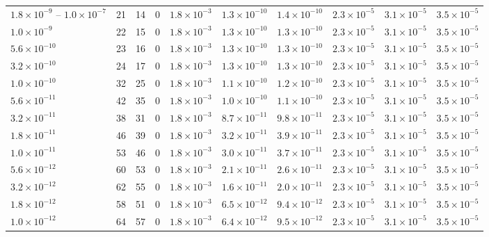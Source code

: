 \begin{tabular}{lrrrrrrrrr}
$1.8\!\times\!10^{-9}$ -- $1.0\!\times\!10^{-7}$ & 21 & 14 & 0 & $1.8\!\times\!10^{-3}$ & $1.3\!\times\!10^{-10}$ & $1.4\!\times\!10^{-10}$ & $2.3\!\times\!10^{-5}$ & $3.1\!\times\!10^{-5}$ & $3.5\!\times\!10^{-5}$\\
$1.0\!\times\!10^{-9}$ & 22 & 15 & 0 & $1.8\!\times\!10^{-3}$ & $1.3\!\times\!10^{-10}$ & $1.3\!\times\!10^{-10}$ & $2.3\!\times\!10^{-5}$ & $3.1\!\times\!10^{-5}$ & $3.5\!\times\!10^{-5}$\\
$5.6\!\times\!10^{-10}$ & 23 & 16 & 0 & $1.8\!\times\!10^{-3}$ & $1.3\!\times\!10^{-10}$ & $1.3\!\times\!10^{-10}$ & $2.3\!\times\!10^{-5}$ & $3.1\!\times\!10^{-5}$ & $3.5\!\times\!10^{-5}$\\
$3.2\!\times\!10^{-10}$ & 24 & 17 & 0 & $1.8\!\times\!10^{-3}$ & $1.3\!\times\!10^{-10}$ & $1.3\!\times\!10^{-10}$ & $2.3\!\times\!10^{-5}$ & $3.1\!\times\!10^{-5}$ & $3.5\!\times\!10^{-5}$\\
$1.0\!\times\!10^{-10}$ & 32 & 25 & 0 & $1.8\!\times\!10^{-3}$ & $1.1\!\times\!10^{-10}$ & $1.2\!\times\!10^{-10}$ & $2.3\!\times\!10^{-5}$ & $3.1\!\times\!10^{-5}$ & $3.5\!\times\!10^{-5}$\\
$5.6\!\times\!10^{-11}$ & 42 & 35 & 0 & $1.8\!\times\!10^{-3}$ & $1.0\!\times\!10^{-10}$ & $1.1\!\times\!10^{-10}$ & $2.3\!\times\!10^{-5}$ & $3.1\!\times\!10^{-5}$ & $3.5\!\times\!10^{-5}$\\
$3.2\!\times\!10^{-11}$ & 38 & 31 & 0 & $1.8\!\times\!10^{-3}$ & $8.7\!\times\!10^{-11}$ & $9.8\!\times\!10^{-11}$ & $2.3\!\times\!10^{-5}$ & $3.1\!\times\!10^{-5}$ & $3.5\!\times\!10^{-5}$\\
$1.8\!\times\!10^{-11}$ & 46 & 39 & 0 & $1.8\!\times\!10^{-3}$ & $3.2\!\times\!10^{-11}$ & $3.9\!\times\!10^{-11}$ & $2.3\!\times\!10^{-5}$ & $3.1\!\times\!10^{-5}$ & $3.5\!\times\!10^{-5}$\\
$1.0\!\times\!10^{-11}$ & 53 & 46 & 0 & $1.8\!\times\!10^{-3}$ & $3.0\!\times\!10^{-11}$ & $3.7\!\times\!10^{-11}$ & $2.3\!\times\!10^{-5}$ & $3.1\!\times\!10^{-5}$ & $3.5\!\times\!10^{-5}$\\
$5.6\!\times\!10^{-12}$ & 60 & 53 & 0 & $1.8\!\times\!10^{-3}$ & $2.1\!\times\!10^{-11}$ & $2.6\!\times\!10^{-11}$ & $2.3\!\times\!10^{-5}$ & $3.1\!\times\!10^{-5}$ & $3.5\!\times\!10^{-5}$\\
$3.2\!\times\!10^{-12}$ & 62 & 55 & 0 & $1.8\!\times\!10^{-3}$ & $1.6\!\times\!10^{-11}$ & $2.0\!\times\!10^{-11}$ & $2.3\!\times\!10^{-5}$ & $3.1\!\times\!10^{-5}$ & $3.5\!\times\!10^{-5}$\\
$1.8\!\times\!10^{-12}$ & 58 & 51 & 0 & $1.8\!\times\!10^{-3}$ & $6.5\!\times\!10^{-12}$ & $9.4\!\times\!10^{-12}$ & $2.3\!\times\!10^{-5}$ & $3.1\!\times\!10^{-5}$ & $3.5\!\times\!10^{-5}$\\
$1.0\!\times\!10^{-12}$ & 64 & 57 & 0 & $1.8\!\times\!10^{-3}$ & $6.4\!\times\!10^{-12}$ & $9.5\!\times\!10^{-12}$ & $2.3\!\times\!10^{-5}$ & $3.1\!\times\!10^{-5}$ & $3.5\!\times\!10^{-5}$\\
\bottomrule\end{tabular}